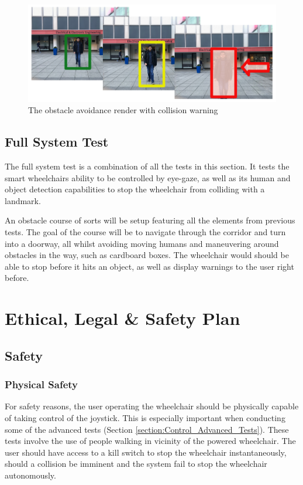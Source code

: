 \documentclass[12pt,a4paper]{report}
\begin{document}
\begin{figure}[ht!]
	\begin{center}
		\includegraphics[width=1\linewidth]{Images/Evaluation/ObjectAvoidance/Object_Avoidance_Render.png}
		\caption{The obstacle avoidance render with collision warning}
		\label{fig:ObsAvoid_Render}
	\end{center}
\end{figure}


\section{Full System Test}
The full system test is a combination of all the tests in this section. It tests the smart wheelchairs ability to be controlled by eye-gaze, as well as its human and object detection capabilities to stop the wheelchair from colliding with a landmark.

An obstacle course of sorts will be setup featuring all the elements from previous tests. The goal of the course will be to navigate through the corridor and turn into a doorway, all whilst avoiding moving humans and maneuvering around obstacles in the way, such as cardboard boxes. The wheelchair would should be able to stop before it hits an object, as well as display warnings to the user right before.


\newpage
\chapter{Ethical, Legal \& Safety Plan}

\section{Safety}

\subsection{Physical Safety}
For safety reasons, the user operating the wheelchair should be physically capable of taking control of the joystick. This is especially important when conducting some of the advanced tests (Section \ref{section:Control_Advanced_Tests}). These tests involve the use of people walking in vicinity of the powered wheelchair. The user should have access to a kill switch to stop the wheelchair instantaneously, should a collision be imminent and the system fail to stop the wheelchair autonomously.
\end{document}
